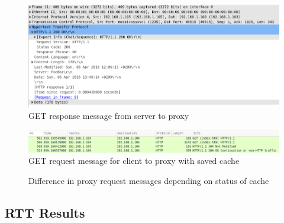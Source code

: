 \documentclass[10pt,twocolumn]{witseiepaper}
\begin{document}
		\begin{figure}[h!]
			\centering
			\includegraphics[width=\columnwidth]{resources/proxy_server}
			\caption{GET response message from server to proxy}
			\label{fig:proxy_server}
		\end{figure}
		
		\begin{figure}[h!]
			\centering
			\includegraphics[width=\columnwidth]{resources/proxy_cache}
			\caption{GET request message for client to proxy with saved cache}
			\label{fig:proxy_cache}
		\end{figure}
		
		\begin{figure}[h!]
			\centering
			 \hspace{1cm}
			\caption{Difference in proxy request messages depending on status of cache}
			\label{fig:proxy_comparrison}
		\end{figure}
		
	\subsection{RTT Results}
	\label{app:rtt}
		
\end{document}
